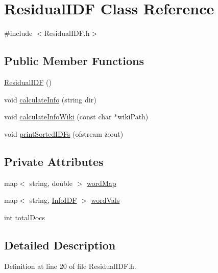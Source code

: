 \hypertarget{classResidualIDF}{\section{\-Residual\-I\-D\-F \-Class \-Reference}
\label{classResidualIDF}
}


{\ttfamily \#include $<$\-Residual\-I\-D\-F.\-h$>$}

\subsection*{\-Public \-Member \-Functions}
\begin{DoxyCompactItemize}
\item 
\hyperlink{classResidualIDF_aeea185a8e06834b01a71cd2dab21ddbb}{\-Residual\-I\-D\-F} ()
\item 
void \hyperlink{classResidualIDF_a3de6f0772d6e2468e2efdf7c34a7e8dc}{calculate\-Info} (string dir)
\item 
void \hyperlink{classResidualIDF_af925c5cd70bb796241b22e6f55ac287a}{calculate\-Info\-Wiki} (const char $\ast$wiki\-Path)
\item 
void \hyperlink{classResidualIDF_a796dba5d0496a8da17b8783aab45efc2}{print\-Sorted\-I\-D\-Fs} (ofstream \&out)
\end{DoxyCompactItemize}
\subsection*{\-Private \-Attributes}
\begin{DoxyCompactItemize}
\item 
map$<$ string, double $>$ \hyperlink{classResidualIDF_a079156a1a77c0a5278399a55fb6e57bc}{word\-Map}
\item 
map$<$ string, \hyperlink{classInfoIDF}{\-Info\-I\-D\-F} $>$ \hyperlink{classResidualIDF_aeb4512a5c664c4163b1f35d98357e583}{word\-Vals}
\item 
int \hyperlink{classResidualIDF_abf955a0231682be307c0c7eca6c52828}{total\-Docs}
\end{DoxyCompactItemize}


\subsection{\-Detailed \-Description}


\-Definition at line 20 of file \-Residual\-I\-D\-F.\-h.



